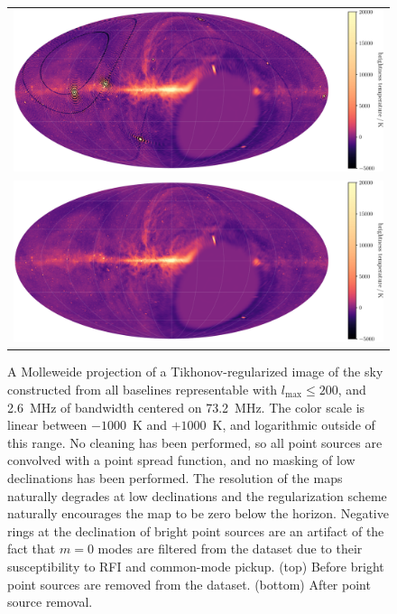 \begin{bibunit}
\begin{figure}
    \centering
    \begin{tabular}{c}
        \includegraphics[width=\textwidth]{figures/chapter4/sky-map-colorbar} \\
        \includegraphics[width=\textwidth]{figures/chapter4/peeled-sky-map-colorbar} \\
    \end{tabular}
    \caption{
        A Molleweide projection of a Tikhonov-regularized image of the sky constructed from all
        baselines representable with $l_\text{max} \le 200$, and 2.6~MHz of bandwidth centered on
        73.2~MHz. The color scale is linear between $-1000$~K and $+1000$~K, and logarithmic outside
        of this range. No cleaning has been performed, so all point sources are convolved with a
        point spread function, and no masking of low declinations has been performed. The resolution
        of the maps naturally degrades at low declinations and the regularization scheme naturally
        encourages the map to be zero below the horizon. Negative rings at the declination of bright
        point sources are an artifact of the fact that $m=0$ modes are filtered from the dataset due
        to their susceptibility to RFI and common-mode pickup. (top) Before bright point sources are
        removed from the dataset. (bottom) After point source removal.
    }
    \label{fig:before-after-source-removal-sky-maps}
\end{figure}


\end{bibunit}
